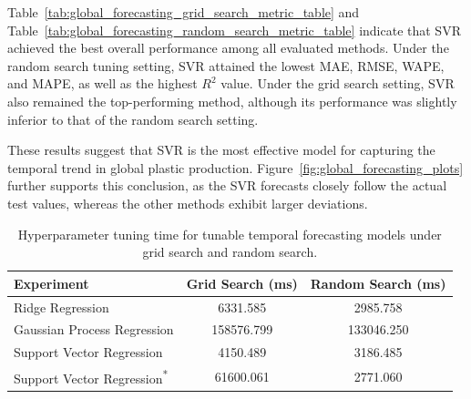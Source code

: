 
Table~\ref{tab:global_forecasting_grid_search_metric_table} and Table~\ref{tab:global_forecasting_random_search_metric_table} indicate that SVR achieved the best overall performance among all evaluated methods. Under the random search tuning setting, SVR attained the lowest MAE, RMSE, WAPE, and MAPE, as well as the highest \(R^2\) value. Under the grid search setting, SVR also remained the top-performing method, although its performance was slightly inferior to that of the random search setting.

These results suggest that SVR is the most effective model for capturing the temporal trend in global plastic production. Figure~\ref{fig:global_forecasting_plots} further supports this conclusion, as the SVR forecasts closely follow the actual test values, whereas the other methods exhibit larger deviations.

\begin{table}[!ht]
	\centering
	\caption{\centering Hyperparameter tuning time for tunable temporal forecasting models under grid search and random search.}
	\begin{tabular}{@{}lcc@{}}
		\toprule
		\textbf{Experiment}                          & \textbf{Grid Search (ms)} & \textbf{Random Search (ms)} \\
		\midrule
		Ridge Regression                             & 6331.585                  & 2985.758                    \\
		Gaussian Process Regression                  & 158576.799                & 133046.250                  \\
		Support Vector Regression                    & 4150.489                  & 3186.485                    \\
		Support Vector Regression\textsuperscript{*} & 61600.061                 & 2771.060                    \\
		\hline
	\end{tabular}
	\label{tab:forecasting_tuning_time}
\end{table}

